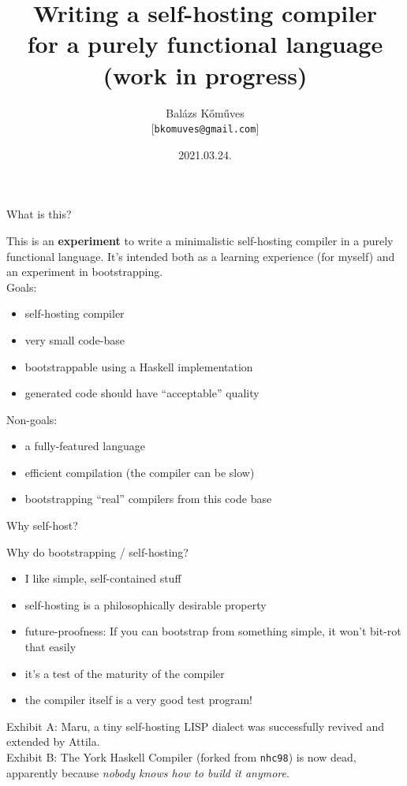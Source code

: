 \documentclass{beamer}
\title{Writing a self-hosting compiler \\ for a purely functional language\\
{\footnotesize (work in progress)}}
\author{Bal\'azs K\H{o}m\H{u}ves \\ {\small [{\tt bkomuves@gmail.com}]}}
\date{2021.03.24.}
\begin{document}
\begin{frame}
\titlepage
\end{frame}


\begin{frame}{What is this?}

This is an {\bf experiment} to write a minimalistic self-hosting compiler
in a purely functional language. It's intended both as a learning
experience (for myself) and an experiment in bootstrapping.\\[15pt]

Goals:
\begin{itemize}
\item self-hosting compiler
\item very small code-base
\item bootstrappable using a Haskell implementation
\item generated code should have ``acceptable'' quality \\[15pt]
\end{itemize}

Non-goals:
\begin{itemize}
\item a fully-featured language
\item efficient compilation (the compiler can be slow)
\item bootstrapping ``real'' compilers from this code base
\end{itemize}

\end{frame}


\begin{frame}{Why self-host?}

Why do bootstrapping / self-hosting?\\[10pt]

\begin{itemize}
\item I like simple, self-contained stuff
\item self-hosting is a philosophically desirable property
\item future-proofness: If you can bootstrap from something simple, it won't bit-rot that easily
\item it's a test of the maturity of the compiler
\item the compiler itself is a very good test program! \\[15pt]
\end{itemize}

Exhibit A: Maru, a tiny self-hosting LISP dialect was successfully revived and
extended by Attila.\\[15pt]

Exhibit B: The York Haskell Compiler (forked from {\tt nhc98}) is now dead, apparently
because \emph{nobody knows how to build it anymore}.

\end{frame}
\end{document}
